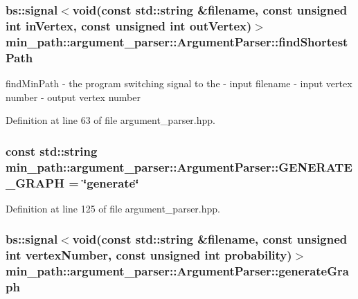 \subsubsection[{\texorpdfstring{find\+Shortest\+Path}{findShortestPath}}]{\setlength{\rightskip}{0pt plus 5cm}bs\+::signal$<$void(const std\+::string \&filename, const unsigned int in\+Vertex, const unsigned int out\+Vertex)$>$ min\+\_\+path\+::argument\+\_\+parser\+::\+Argument\+Parser\+::find\+Shortest\+Path}\hypertarget{classmin__path_1_1argument__parser_1_1_argument_parser_a7eb42d6b80eabc27953b1e2ddb08f7f1}{}\label{classmin__path_1_1argument__parser_1_1_argument_parser_a7eb42d6b80eabc27953b1e2ddb08f7f1}


find\+Min\+Path -\/ the program switching signal to the   -\/ input filename  -\/ input vertex number  -\/ output vertex number 



Definition at line 63 of file argument\+\_\+parser.\+hpp.

\subsubsection[{\texorpdfstring{G\+E\+N\+E\+R\+A\+T\+E\+\_\+\+G\+R\+A\+PH}{GENERATE_GRAPH}}]{\setlength{\rightskip}{0pt plus 5cm}const std\+::string min\+\_\+path\+::argument\+\_\+parser\+::\+Argument\+Parser\+::\+G\+E\+N\+E\+R\+A\+T\+E\+\_\+\+G\+R\+A\+PH = \char`\"{}generate\char`\"{}}\hypertarget{classmin__path_1_1argument__parser_1_1_argument_parser_a4b56bd44886c90debd323f54761489a6}{}\label{classmin__path_1_1argument__parser_1_1_argument_parser_a4b56bd44886c90debd323f54761489a6}


Definition at line 125 of file argument\+\_\+parser.\+hpp.

\subsubsection[{\texorpdfstring{generate\+Graph}{generateGraph}}]{\setlength{\rightskip}{0pt plus 5cm}bs\+::signal$<$void(const std\+::string \&filename, const unsigned int vertex\+Number, const unsigned int probability)$>$ min\+\_\+path\+::argument\+\_\+parser\+::\+Argument\+Parser\+::generate\+Graph}\hypertarget{classmin__path_1_1argument__parser_1_1_argument_parser_a5a6e6dd3ac7502d0269b2756383f1923}{}\label{classmin__path_1_1argument__parser_1_1_argument_parser_a5a6e6dd3ac7502d0269b2756383f1923}


